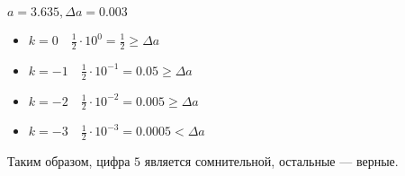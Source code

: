 \begin{example}
    \(a = 3.635, \Delta a = 0.003\)
    \begin{itemize}
        \item \(k = 0 \quad \frac{1}{2} \cdot 10^0 = \frac{1}{2} \geq \Delta a\)
        \item \(k = - 1 \quad \frac{1}{2} \cdot 10^{ - 1} = 0.05 \geq \Delta a\)
        \item \(k = - 2 \quad \frac{1}{2} \cdot 10^{ - 2} = 0.005 \geq \Delta a\)
        \item \(k = - 3 \quad \frac{1}{2} \cdot 10^{ - 3} = 0.0005 < \Delta a\)
    \end{itemize}

    Таким образом, цифра \(5\) является сомнительной, остальные --- верные.
\end{example}

